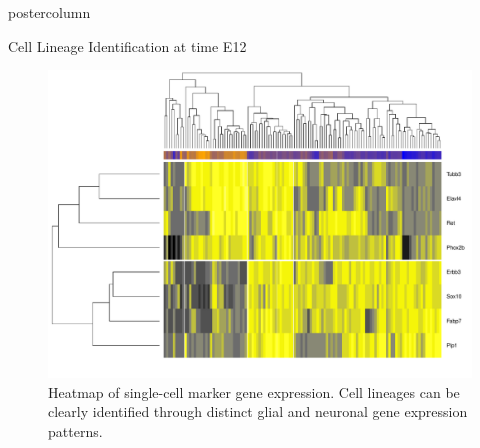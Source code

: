 \documentclass{beamer}
\begin{document}
\begin{frame}
\begin{columns}
\begin{column}{.45\textwidth}
\begin{beamercolorbox}[center]{postercolumn}
\begin{minipage}{.98\textwidth}
{\begin{myblock}{Cell Lineage Identification at time E12}
\begin{figure}
\begin{minipage}{0.45\textwidth}
	\centering\includegraphics[width=1.0\textwidth]{./heatmap.pdf}
	\caption{Heatmap of single-cell marker gene expression.
			Cell lineages can be clearly identified through distinct
			glial and neuronal gene expression patterns.}
	\label{fig:heatmap}
\end{minipage}


\end{figure}
\end{myblock}}
\end{minipage}
\end{beamercolorbox}
\end{column}
\end{columns}
\end{frame}
\end{document}
